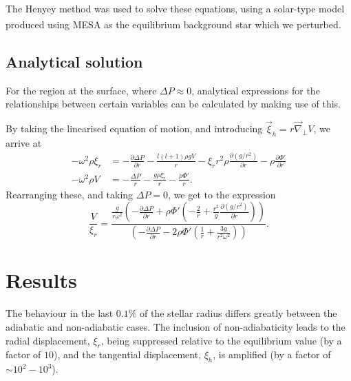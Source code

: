 \documentclass[a0,portrait]{a0poster}
\begin{document}
\begin{multicols}{2}
The Henyey method \textsuperscript{\cite{Henyey1964}} was used to solve these equations, using a solar-type model produced using MESA \textsuperscript{\cite{Paxton2018}} as the equilibrium background star which we perturbed.


\subsection*{Analytical solution}

For the region at the surface, where $\Delta P \approx 0$, analytical expressions for the relationships between certain variables can be calculated by making use of this.

By taking the linearised equation of motion, and introducing $\vec{\xi}_{h} = r \vec{\nabla}_{\perp} V$, we arrive at
\small
\begin{align}
- \omega^{2} \rho \xi_{r} & = - \frac{\partial \Delta P}{\partial r} - \frac{l (l+1) \rho g V}{r} - \xi_{r} r^{2} \rho \frac{\partial \left( g / r^{2} \right) }{\partial r} - \rho \frac{\partial \Phi'}{\partial r}
\\
- \omega^{2} \rho V & = - \frac{\Delta P}{r}  -  \frac{g \rho \xi_{r}}{r} - \frac{\rho \Phi'}{r}.
\end{align}
\normalsize
Rearranging these, and taking $\Delta P = 0$, we get to the expression
\small
\begin{equation}
\label{eq:V_over_xi_r}
\frac{V}{\xi_{r}} = \frac{ \frac{g}{r \omega^{2}} \left( - \frac{\partial \Delta P}{\partial r} + \rho \Phi' \left( -\frac{2}{r} + \frac{r^{2}}{g} \frac{\partial \left( g/r^{2} \right)}{\partial r} \right) \right)  }{\left( - \frac{\partial \Delta P}{\partial r} - 2 \rho \Phi' \left( \frac{1}{r} + \frac{3 g}{r^{2} \omega^{2}} \right) \right) }.
\end{equation}
\normalsize




\section*{Results}

The behaviour in the last $0.1\%$ of the stellar radius differs greatly between the adiabatic and non-adiabatic cases. The inclusion of non-adiabaticity leads to the radial displacement, $\xi_{r}$, being suppressed relative to the equilibrium value (by a factor of $10$), and the tangential displacement, $\xi_{h}$, is amplified (by a factor of $\sim 10^{2} - 10^{3}$).


\end{multicols}
\end{document}
